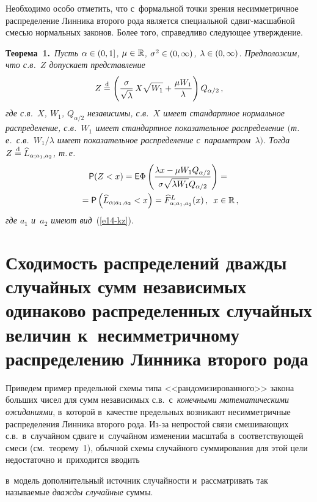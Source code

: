 \begin{multicols}{2}
Необходимо особо отметить, что с~формальной точки зрения
несимметричное распределение Линника второго рода является
специальной сдвиг-мас\-шаб\-ной смесью нормальных законов. Более того,
справедливо следующее утверждение.

\smallskip

\noindent
\textbf{Теорема~1.}\ \textit{Пусть $\alpha\hm\in(0,1]$, $\mu\hm\in\mathbb{R}$,
$\sigma^2\hm\in(0,\infty)$, $\lambda\hm\in(0,\infty)$. Предположим, что с.в.~$Z$ 
допускает представление}
$$
Z\stackrel{\mathrm{d}}{=} \left(\displaystyle\frac{\displaystyle \sigma\mathstrut}{\displaystyle \sqrt{\lambda}\mathstrut}\, X\sqrt{W_1}+\displaystyle\frac{\displaystyle \mu
W_1\mathstrut}{\displaystyle \lambda\mathstrut}\right) Q_{\alpha/2}\,,
$$
\textit{где с.в.~$X$, $W_1$, $Q_{\alpha/2}$ независимы, с.в.~$X$ имеет
стандартное нормальное распределение, с.в.~$W_1$ имеет стандартное
показательное распределение $($т.\,е.\ с.в.~$W_1/\lambda$ имеет
показательное распределение с~параметром~$\lambda)$. Тогда $Z\stackrel{\mathrm{d}}{=}
\widehat L_{\alpha;a_1,a_2}$, т.\,е.}
\begin{multline*}
{\sf P}(Z<x)={\sf E}\Phi\left(\displaystyle\frac{\displaystyle \lambda x-\mu W_1
Q_{\alpha/2}\mathstrut}{\displaystyle \sigma\sqrt{\lambda W_1}Q_{\alpha/2}\mathstrut}\right)={}\\
{}={\sf P}
\left(\widehat L_{\alpha;a_1,a_2}<x\right)=\widehat F^{L}_{\alpha;a_1,a_2}(x)\,,\enskip
x\in\mathbb{R}\,,
\end{multline*}
\textit{где $a_1$ и~$a_2$ имеют вид}~(\ref{e14-kz}).

\section{Сходимость распределений дважды случайных сумм независимых одинаково
распределенных случайных величин к~несимметричному распределению
Линника второго рода}

Приведем пример предельной схемы типа <<рандомизированного>> закона
больших чисел для сумм независимых с.в.\ с~\textit{конечными
математическими ожиданиями}, в~которой в~качестве предельных
возникают несимметричные распределения Линника второго рода. Из-за
непростой связи смешива\-ющих с.в.\ в~случайном сдвиге и~случайном
изменении масштаба в~соответствующей смеси (см.\ теорему~1), обычной
схемы случайного суммирования для этой цели недостаточно 
и~приходится вводить\linebreak\vspace*{-12pt}

\columnbreak

\noindent
 в~модель дополнительный источник случайности 
и~рас\-смат\-ри\-вать так называемые \textit{дважды случайные} суммы.
{

}
\end{multicols}

